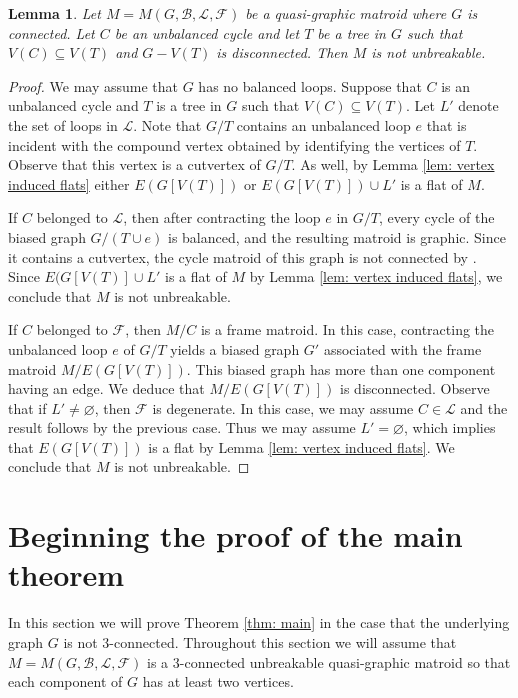 \documentclass[12pt]{article}
\newtheorem{lemma}[theorem]{Lemma}
\theoremstyle{definition}
\theoremstyle{plain} %
\newcommand{\cB}{\mathcal{B}}
\newcommand{\cF}{\mathcal{F}}
\newcommand{\cL}{\mathcal{L}}
\begin{document}
\begin{lemma}\label{lem: tree deletion disconnects G}
Let $M=M(G, \cB,\cL,\cF)$ be a quasi-graphic matroid where $G$ is connected.
Let $C$ be an unbalanced cycle and let $T$ be a tree in $G$ such that $V(C) \subseteq V(T)$ and $G - V(T)$ is disconnected. 
Then $M$ is not unbreakable.
\end{lemma}
\begin{proof}
    We may assume that $G$ has no balanced loops. Suppose that $C$ is an unbalanced cycle and $T$ is a tree in $G$ such that $V(C) \subseteq V(T)$. Let $L'$ denote the set of loops in $\cL$. Note that $G/T$ contains an unbalanced loop $e$ that is incident with the compound vertex obtained by identifying the vertices of $T$. Observe that this vertex is a cutvertex of $G/T$. As well, by Lemma \ref{lem: vertex induced flats} either $E(G[V(T)])$ or $E(G[V(T)])\cup L'$ is a flat of $M$. 

    If $C$ belonged to $\cL$, then after contracting the loop $e$ in $G/T$, every cycle of the biased graph $G/(T\cup e)$ is balanced, and the resulting matroid is graphic. Since it contains a cutvertex, the cycle matroid of this graph is not connected by \cite[Proposition 4.1.7]{Oxley2011}. Since $E(G[V(T)]\cup L'$ is a flat of $M$ by Lemma \ref{lem: vertex induced flats}, we conclude that $M$ is not unbreakable.
    
    If $C$ belonged to $\cF$, then $M/C$ is a frame matroid. In this case, contracting the unbalanced loop $e$ of $G/T$ yields a biased graph $G'$ associated with the frame matroid $M/E(G[V(T)])$. This biased graph has more than one component having an edge. We deduce that $M/E(G[V(T)])$ is disconnected. Observe that if $L'\neq\varnothing$, then $\cF$ is degenerate. In this case, we may assume $C\in\cL$ and the result follows by the previous case. Thus we may assume $L'=\varnothing$, which implies that $E(G[V(T)])$ is a flat by Lemma \ref{lem: vertex induced flats}. We conclude that $M$ is not unbreakable.
\end{proof}



\section{Beginning the proof of the main theorem} \label{sec: when G is not 3-connected}

In this section we will prove Theorem \ref{thm: main} in the case that the underlying graph $G$ is not $3$-connected.
Throughout this section we will assume that $M = M(G, \cB,\cL,\cF)$ is a $3$-connected unbreakable quasi-graphic matroid so that each component of $G$ has at least two vertices. 
\end{document}
